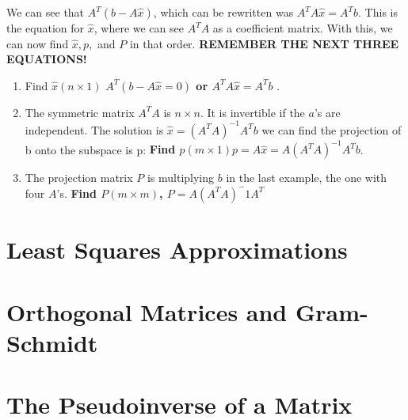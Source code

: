 We can see that \(A^{T}(b-A\hat{x})\), which can be rewritten was \(A^{T}A\hat{x} = A^{T}b\). This is the equation for \(\hat{x}\), where we can see \(A^{T}A\) as a coefficient matrix. With this, we can now find \(\hat{x}, p,\) and \(P\) in that order. \textbf{REMEMBER THE NEXT THREE EQUATIONS!}
\begin{enumerate}
    \item Find \(\hat{x} (n \times 1)\) \textbf{\(A^{T}(b - A\hat{x} = 0)\) or \(A^{T}A\hat{x} = A^{T}b\)} . 
    \item The symmetric matrix \(A^{T}A\) is \(n \times n\). It is invertible if the \(a\)'s are independent. The solution is \(\hat{x} = (A^{T}A)^{-1}A^{T}b\) we can find the projection of b onto the subspace is p: \textbf{Find \(p (m \times 1) p = A\hat{x} = A(A^{T}A)^{-1}A^{T}b \)}. 
    \item The projection matrix \(P\) is multiplying \(b\) in the last example, the one with four \(A\)'s. \textbf{Find \(P (m \times m)\), \(P = A(A^T A)^-1 A^T\)  }       
\end{enumerate} 

\section{Least Squares Approximations}

\section{Orthogonal Matrices and Gram-Schmidt}

\section{The Pseudoinverse of a Matrix}
